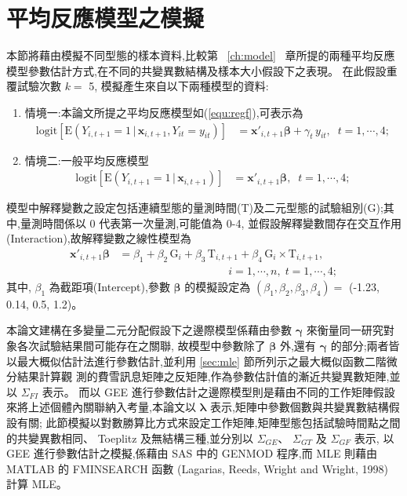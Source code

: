 \section{平均反應模型之模擬}\label{sec:simuMODEL}
\noindent 本節將藉由模擬不同型態的樣本資料,比較第~ \ref{ch:model} ~章所提的兩種平均反應模型參數估計方式,在不同的共變異數結構及樣本大小假設下之表現。
在此假設重覆試驗次數 $k=$ 5, 模擬產生來自以下兩種模型的資料:
\begin{enumerate}
  \item 情境一:本論文所提之平均反應模型如(\ref{equ:regf}),可表示為
    \begin{align*}
        \mbox{logit}\left[\mbox{E}(Y_{i,t+1}=1 \,|\,\bm{x}_{i,t+1},Y_{it}=y_{it})\right] &=\bm{x}'_{i,t+1}\bm{\beta}+\gamma_t\, y_{it},\;\;t=1,\cdots,4;
    \end{align*}
  \item 情境二:一般平均反應模型
    \begin{align*}
        \mbox{logit}\left[\mbox{E}(Y_{i,t+1}=1 \,|\,\bm{x}_{i,t+1})\right] &=\bm{x}'_{i,t+1}\bm{\beta},\;\;t=1,\cdots,4;
    \end{align*}
  \end{enumerate}
模型中解釋變數之設定包括連續型態的量測時間(T)及二元型態的試驗組別(G);其中,量測時間係以 0 代表第一次量測,可能值為 0-4,
並假設解釋變數間存在交互作用(Interaction),故解釋變數之線性模型為
\begin{align*}
   \bm{x}'_{i,t+1}\bm{\beta} &=\beta_1 + \beta_2\, \mbox{G}_i + \beta_3\, \mbox{T}_{i,t+1} + \beta_4 \,\mbox{G}_i \times \mbox{T}_{i,t+1},   \\
                             &\qquad\qquad\qquad\qquad\qquad i=1,\cdots,n,\; t=1,\cdots,4;
\end{align*}
其中, $\beta_1$ 為截距項(Intercept),參數 $\bm{\beta}$ 的模擬設定為 $(\beta_1, \beta_2, \beta_3, \beta_4)=$ (-1.23, 0.14, 0.5, 1.2)。

本論文建構在多變量二元分配假設下之邊際模型係藉由參數 $\bm{\gamma}$ 來衡量同一研究對象各次試驗結果間可能存在之關聯,
故模型中參數除了 $\bm{\beta}$ 外,還有 $\bm{\gamma}$ 的部分;兩者皆以最大概似估計法進行參數估計,並利用 \ref{sec:mle} 節所列示之最大概似函數二階微分結果計算觀
測的費雪訊息矩陣之反矩陣,作為參數估計值的漸近共變異數矩陣,並以 $\Sigma_{FI}$ 表示。
而以 GEE 進行參數估計之邊際模型則是藉由不同的工作矩陣假設來將上述個體內關聯納入考量,本論文以 $\bm{\lambda}$ 表示,矩陣中參數個數與共變異數結構假設有關;
此節模擬以對數勝算比方式來設定工作矩陣,矩陣型態包括試驗時間點之間的共變異數相同、 Toeplitz 及無結構三種,並分別以 $\Sigma_{GE}$、 $\Sigma_{GT}$ 及 $\Sigma_{GF}$ 表示,
以 GEE 進行參數估計之模擬,係藉由 SAS 中的 GENMOD 程序,而 MLE 則藉由 MATLAB 的 FMINSEARCH 函數 (Lagarias, Reeds, Wright and Wright, 1998) 計算 MLE。

